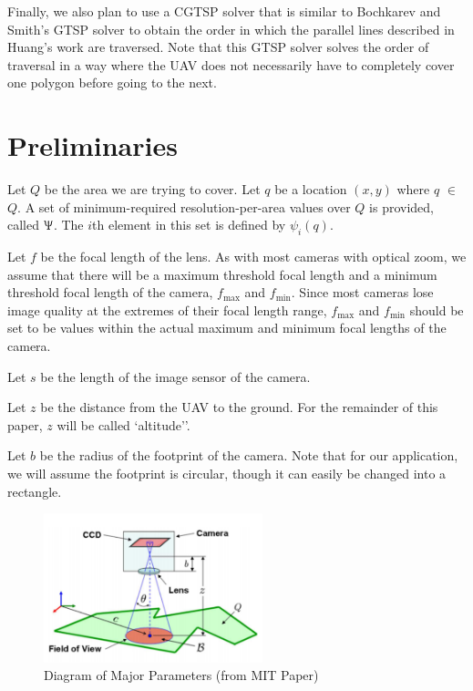 \documentclass[conference]{IEEEtran}
\theoremstyle{plain}%
\begin{document}
Finally, we also plan to use a CGTSP solver that is similar to Bochkarev and Smith's GTSP solver \cite{bochkarevminimizing} to obtain the order in which the parallel lines described in Huang's work are traversed. Note that this GTSP solver solves the order of traversal in a way where the UAV does not necessarily have to completely cover one polygon before going to the next.



\section{Preliminaries} \label{Preliminaries}
Let $Q$ be the area we are trying to cover. Let $q$ be a location $(x,y)$ where $q$ $\in$ $Q$. A set of minimum-required resolution-per-area values over $Q$ is provided, called $\Uppsi$. The $i$th element in this set is defined by $\psi_i(q)$.

Let $f$ be the focal length of the lens. As with most cameras with optical zoom, we assume that there will be a maximum threshold focal length and a minimum threshold focal length of the camera, $f_\textrm{max}$ and $f_\textrm{min}$. Since most cameras lose image quality at the extremes of their focal length range, $f_\textrm{max}$ and $f_\textrm{min}$ should be set to be values within the actual maximum and minimum focal lengths of the camera.

Let $s$ be the length of the image sensor of the camera.

Let $z$ be the distance from the UAV to the ground. For the remainder of this paper, $z$ will be called `altitude''.

Let $b$ be the radius of the footprint of the camera. Note that for our application, we will assume the footprint is circular, though it can easily be changed into a rectangle.

\begin{figure}[!t]
\centering
\includegraphics[width=2.5in]{MIT_pic}
\caption{Diagram of Major Parameters (from MIT Paper)}
\label{major_params}
\end{figure}
\end{document}
